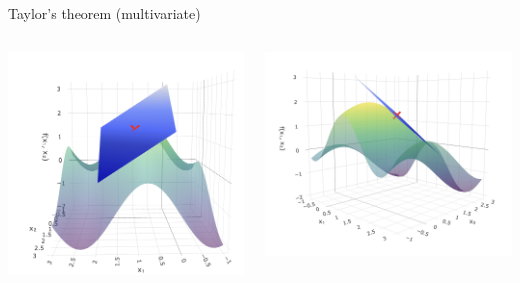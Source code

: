 \documentclass[11pt,compress,t,notes=noshow, xcolor=table]{beamer}
\begin{document}
\begin{vbframe}{Taylor's theorem (multivariate)}
\begin{columns}
    \begin{column}{0.4\textwidth}
        \includegraphics[width = \textwidth]{figure_man/Taylor2D_1st100.png}
    \end{column}
    \begin{column}{0.4\textwidth}
        \includegraphics[width = \textwidth]{figure_man/Taylor2D_1st301.png}
    \end{column}
\end{columns}


\end{vbframe}
\end{document}
